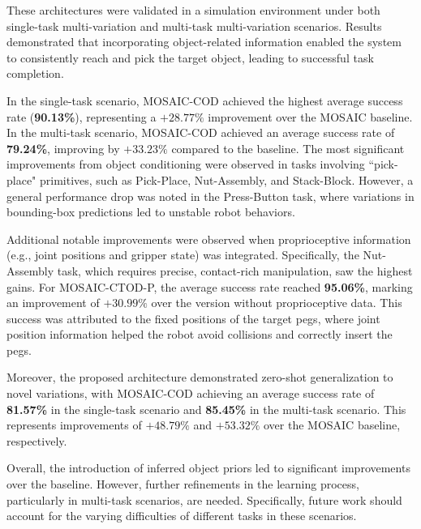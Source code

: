 These architectures were validated in a simulation environment under both single-task multi-variation and multi-task multi-variation scenarios. Results demonstrated that incorporating object-related information enabled the system to consistently reach and pick the target object, leading to successful task completion.

In the single-task scenario, MOSAIC-COD achieved the highest average success rate (\textbf{90.13\%}), representing a $+28.77\%$ improvement over the MOSAIC baseline. In the multi-task scenario, MOSAIC-COD achieved an average success rate of \textbf{79.24\%}, improving by $+33.23\%$ compared to the baseline. The most significant improvements from object conditioning were observed in tasks involving ``pick-place" primitives, such as Pick-Place, Nut-Assembly, and Stack-Block. However, a general performance drop was noted in the Press-Button task, where variations in bounding-box predictions led to unstable robot behaviors.

Additional notable improvements were observed when proprioceptive information (e.g., joint positions and gripper state) was integrated. Specifically, the Nut-Assembly task, which requires precise, contact-rich manipulation, saw the highest gains. For MOSAIC-CTOD-P, the average success rate reached \textbf{95.06\%}, marking an improvement of $+30.99\%$ over the version without proprioceptive data. This success was attributed to the fixed positions of the target pegs, where joint position information helped the robot avoid collisions and correctly insert the pegs.

Moreover, the proposed architecture demonstrated zero-shot generalization to novel variations, with MOSAIC-COD achieving an average success rate of \textbf{81.57\%} in the single-task scenario and \textbf{85.45\%} in the multi-task scenario. This represents improvements of $+48.79\%$ and $+53.32\%$ over the MOSAIC baseline, respectively.

Overall, the introduction of inferred object priors led to significant improvements over the baseline. However, further refinements in the learning process, particularly in multi-task scenarios, are needed. Specifically, future work should account for the varying difficulties of different tasks in these scenarios.